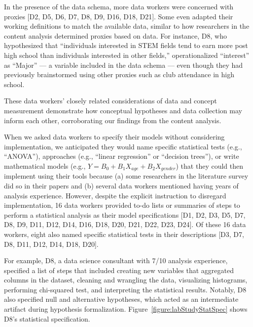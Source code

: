In the presence of the data schema, more data workers were concerned with proxies
[D2, D5, D6, D7, D8, D9, D16, D18, D21]. Some even adapted their working
definitions to match the available data, similar to how researchers in the
content analysis determined proxies based on data. For instance, D8, who hypothesized that
``individuals interested in STEM fields tend to earn more post high school than
individuals interested in other fields,'' operationalized ``interest'' as
``Major'' --- a variable included in the data schema --- even though they had
previously brainstormed using other proxies such as club attendance in high school. 



These data workers' closely related considerations of data and concept measurement
demonstrate how conceptual hypotheses and data collection may inform each other,
corroborating our findings from the content analysis.


\figureLabStudyStatSpec When we asked data workers to specify their models
without considering implementation, we anticipated they would name specific
statistical tests (e.g., ``ANOVA''), approaches (e.g., ``linear regression'' or
``decision trees''), or write mathematical models (e.g., $Y = B_0 + B_1X_{age} +
B_2X_{gender}$) that they could then implement using their tools because (a) some
researchers in the literature survey did so in their papers and (b) several data
workers mentioned having years of analysis experience. However, despite the
explicit instruction to disregard implementation, 16 data workers provided to-do
lists or summaries of steps to perform a statistical analysis as their model
specifications [D1, D2, D3, D5, D7, D8, D9, D11, D12, D14, D16, D18, D20, D21,
D22, D23, D24]. Of these 16 data workers, eight also named specific statistical
tests in their descriptions [D3, D7, D8, D11, D12, D14, D18, D20]. 

For example, D8, a data science consultant with 7/10 analysis experience,
specified a list of steps that included creating new variables that aggregated
columns in the dataset, cleaning and wrangling the data, visualizing histograms,
performing chi-squared test, and interpreting the statistical results. Notably,
D8 also specified null and alternative hypotheses, which acted as an
intermediate artifact during hypothesis formalization.
Figure~\ref{figure:labStudyStatSpec} shows D8's statistical specification.

